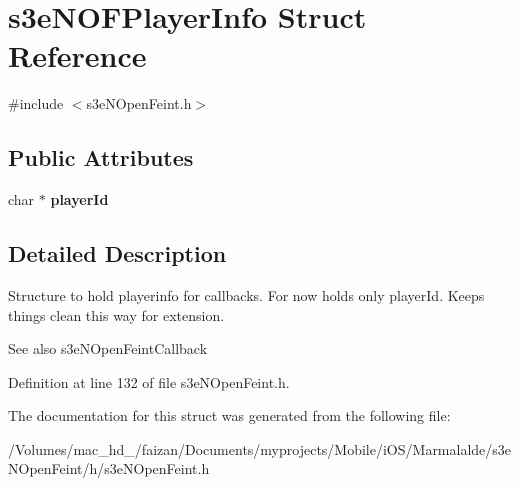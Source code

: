 \hypertarget{structs3e_n_o_f_player_info}{
\section{s3eNOFPlayerInfo Struct Reference}
\label{structs3e_n_o_f_player_info}
}


{\ttfamily \#include $<$s3eNOpenFeint.h$>$}

\subsection*{Public Attributes}
\begin{DoxyCompactItemize}
\item 
\hypertarget{structs3e_n_o_f_player_info_a30ac2a010171e6ad878cb9cdc0c906ce}{
char $\ast$ {\bfseries playerId}}
\label{structs3e_n_o_f_player_info_a30ac2a010171e6ad878cb9cdc0c906ce}

\end{DoxyCompactItemize}


\subsection{Detailed Description}
Structure to hold playerinfo for callbacks. For now holds only playerId. Keeps things clean this way for extension.

\begin{DoxySeeAlso}{See also}
s3eNOpenFeintCallback 
\end{DoxySeeAlso}


Definition at line 132 of file s3eNOpenFeint.h.



The documentation for this struct was generated from the following file:\begin{DoxyCompactItemize}
\item 
/Volumes/mac\_\-hd\_/faizan/Documents/myprojects/Mobile/iOS/Marmalalde/s3eNOpenFeint/h/s3eNOpenFeint.h\end{DoxyCompactItemize}

